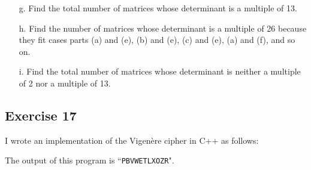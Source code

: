 \documentclass[12pt]{article}
\begin{document}
\begin{itemize}
\item[g.] Find the total number of matrices whose determinant is a multiple of 13.

\item[h.] Find the number of matrices whose determinant is a multiple of 26 because they fit cases parts (a) and (e), (b) and (e), (c) and (e), (a) and (f), and so on.

\item[i.] Find the total number of matrices whose determinant is neither a multiple of 2 nor a multiple of 13.
\end{itemize}

\subsection*{Exercise 17}
I wrote an implementation of the Vigen\`{e}re cipher in C++ as follows:

The output of this program is ``{\tt PBVWETLXOZR}".
\end{document}
